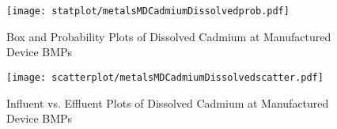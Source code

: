         \begin{figure}[hb]   %
            \centering
            \texttt{[image: statplot/metalsMDCadmiumDissolvedprob.pdf]}
            \caption{Box and Probability Plots of Dissolved Cadmium at Manufactured Device BMPs}
        \end{figure}         %
        
        
        \begin{figure}[hb]   %
            \centering
            \texttt{[image: scatterplot/metalsMDCadmiumDissolvedscatter.pdf]}
            \caption{Influent vs. Effluent Plots of Dissolved Cadmium at Manufactured Device BMPs}
        \end{figure}         %
        \clearpage
        